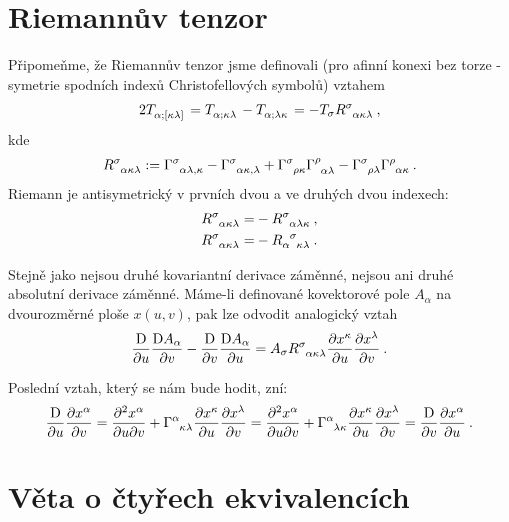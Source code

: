\documentclass{article}
\begin{document}
\section*{Riemannův tenzor}
Připomeňme, že Riemannův tenzor jsme definovali (pro afinní konexi bez torze - symetrie spodních indexů Christofellových symbolů) vztahem
\begin{align}
    2 T\indices{_\alpha_;_[_\kappa_\lambda_]} = T\indices{_\alpha_;_\kappa_\lambda} - T\indices{_\alpha_;_\lambda_\kappa} = - T_\sigma R\indices{^\sigma_\alpha_\kappa_\lambda} \:, \label{eq:Riemann-komutator}
\end{align}
kde
\begin{align}
    R\indices{^\sigma_\alpha_\kappa_\lambda} := \Gamma\indices{^\sigma_\alpha_\lambda_,_\kappa}- \Gamma\indices{^\sigma_\alpha_\kappa_,_\lambda} + \Gamma\indices{^\sigma_\rho_\kappa} \Gamma\indices{^\rho_\alpha_\lambda} - \Gamma\indices{^\sigma_\rho_\lambda} \Gamma\indices{^\rho_\alpha_\kappa} \:.
\end{align}
Riemann je antisymetrický v prvních dvou a ve druhých dvou indexech:
\begin{align}
    R\indices{^\sigma_\alpha_\kappa_\lambda} =& - R\indices{^\sigma_\alpha_\lambda_\kappa} \:, \\
    R\indices{^\sigma_\alpha_\kappa_\lambda} =& - R\indices{_\alpha^\sigma_\kappa_\lambda} \:.
\end{align}

Stejně jako nejsou druhé kovariantní derivace záměnné, nejsou ani druhé absolutní derivace záměnné. Máme-li definované kovektorové pole $A_\alpha$ na dvourozměrné ploše $x(u,v)$, pak lze odvodit analogický vztah
\begin{align}
    \apder{}{u} \apder{A_\alpha}{v} - \apder{}{v} \apder{A_\alpha}{u} = A_\sigma R\indices{^\sigma_\alpha_\kappa_\lambda} \pder{x^\kappa}{u} \pder{x^\lambda}{v} \:. \label{eq:abs-komutator}
\end{align} 

Poslední vztah, který se nám bude hodit, zní:
\begin{align}
    \apder{}{u} \pder{x^\alpha}{v} 
    = \frac{\partial^2 x^\alpha}{\partial u \partial v} + \Gamma\indices{^\alpha_\kappa_\lambda} \pder{x^\kappa}{u} \pder{x^\lambda}{v} 
    = \frac{\partial^2 x^\alpha}{\partial u \partial v} + \Gamma\indices{^\alpha_\lambda_\kappa} \pder{x^\kappa}{u} \pder{x^\lambda}{v} 
    = \apder{}{v} \pder{x^\alpha}{u} \:.
\end{align}

\section*{Věta o čtyřech ekvivalencích}
\end{document}
